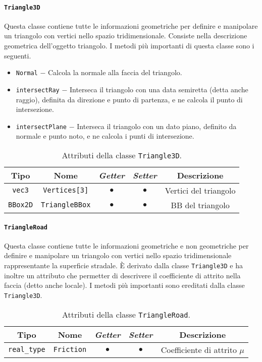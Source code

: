 \paragraph{\texttt{Triangle3D}}
Questa classe contiene tutte le informazioni geometriche per definire e manipolare un triangolo con vertici nello spazio tridimensionale. Consiste nella descrizione geometrica dell'oggetto triangolo. I metodi più importanti di questa classe sono i seguenti.
\begin{itemize}
	\item \texttt{Normal} $-$ Calcola la normale alla faccia del triangolo.
	\item \texttt{intersectRay} $-$ Interseca il triangolo con una data semiretta (detta anche raggio), definita da direzione e punto di partenza, e ne calcola il punto di intersezione.
	\item \texttt{intersectPlane} $-$ Interseca il triangolo con un dato piano, definito da normale e punto noto, e ne calcola i punti di intersezione.
\end{itemize}
\begin{table}[h!]
	\centering
	\begin{tabular}{|c|c|c|c|c|}
		\hline 
		\textbf{Tipo} & \textbf{Nome} & \textit{\textbf{Getter}} & \textit{\textbf{Setter}} & \textbf{Descrizione} \\ \hline 
		\texttt{vec3} & \texttt{Vertices[3]} & $\bullet$ & $\bullet$ & Vertici del triangolo \\ \hline 
		\texttt{BBox2D} & \texttt{TriangleBBox} & $\bullet$ & $\bullet$ & \ac{BB} del triangolo \\ \hline
	\end{tabular}
	\caption{Attributi della classe \texttt{Triangle3D}.}
\end{table}
%
\paragraph{\texttt{TriangleRoad}}
Questa classe contiene tutte le informazioni geometriche e non geometriche per definire e manipolare un triangolo con vertici nello spazio tridimensionale rappresentante la superficie stradale. È derivato dalla classe \texttt{Triangle3D} e ha inoltre un attributo che permetter di descrivere il coefficiente di attrito nella faccia (detto anche locale). I metodi più importanti sono ereditati dalla classe \texttt{Triangle3D}.
\begin{table}[h!]
	\centering
	\begin{tabular}{|c|c|c|c|c|}
		\hline 
		\textbf{Tipo} & \textbf{Nome} & \textit{\textbf{Getter}} & \textit{\textbf{Setter}} & \textbf{Descrizione} \\ \hline 
		\texttt{real\_type} & \texttt{Friction} & $\bullet$ & $\bullet$ & Coefficiente di attrito $\mu$ \\ \hline
	\end{tabular}
	\caption{Attributi della classe \texttt{TriangleRoad}.}
\end{table}
%
